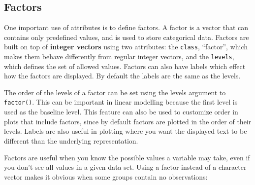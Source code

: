 \documentclass[]{book}
\theoremstyle{definition}
\theoremstyle{definition}
\theoremstyle{definition}
\theoremstyle{remark}
\begin{document}
\hypertarget{factors}{%
\subsection{Factors}\label{factors}}

One important use of attributes is to define factors. A factor is a
vector that can contains only predefined values, and is used to store
categorical data. Factors are built on top of \textbf{integer vectors}
using two attributes: the \texttt{class}, ``factor'', which makes them
behave differently from regular integer vectors, and the
\texttt{levels}, which defines the set of allowed values. Factors can
also have labels which effect how the factors are displayed. By default
the labels are the same as the levels.

The order of the levels of a factor can be set using the levels argument
to \texttt{factor()}. This can be important in linear modelling because
the first level is used as the baseline level. This feature can also be
used to customize order in plots that include factors, since by default
factors are plotted in the order of their levels. Labels are also useful
in plotting where you want the displayed text to be different than the
underlying representation.

Factors are useful when you know the possible values a variable may
take, even if you don't see all values in a given data set. Using a
factor instead of a character vector makes it obvious when some groups
contain no observations:
\end{document}
